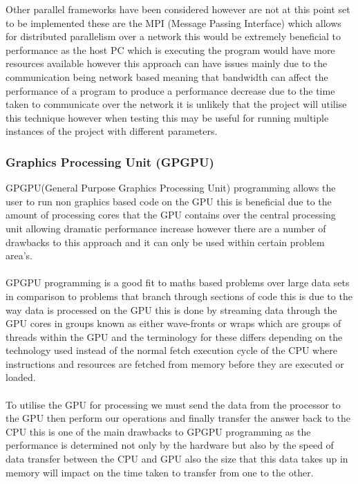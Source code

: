Other parallel frameworks have been considered however are not at this point set to be implemented these are the MPI (Message Passing Interface)\cite{mpi} which allows for distributed parallelism over a network this would be extremely beneficial to performance as the host PC which is executing the program would have more resources available however this approach can have issues mainly due to the communication being network based meaning that bandwidth can affect the performance of a program to produce a performance decrease due to the time taken to communicate over the network it is unlikely that the project will utilise this technique however when testing this may be useful for running multiple instances of the project with different parameters. 

\subsubsection{Graphics Processing Unit (GPGPU)}
GPGPU(General Purpose Graphics Processing Unit) programming allows the user to run non graphics based code on the GPU this is beneficial due to the amount of processing cores that the GPU contains over the central processing unit allowing dramatic performance increase however there are a number of drawbacks to this approach and it can only be used within certain problem area's.\\\\ GPGPU programming is a good fit to maths based problems over large data sets in comparison to problems that branch through sections of code this is due to the way data is processed on the GPU this is done by streaming data through the GPU cores in groups known as either wave-fronts or wraps which are groups of threads within the GPU and the terminology for these differs depending on the technology used instead of the normal fetch execution cycle of the CPU where instructions and resources are fetched from memory before they are executed or loaded.\\\\ To utilise the GPU for processing we must send the data from the processor to the GPU then perform our operations and finally transfer the answer back to the CPU this is one of the main drawbacks to GPGPU programming as the performance is determined not only by the hardware but also by the speed of data transfer between the CPU and GPU also the size that this data takes up in memory will impact on the time taken to transfer from one to the other.\\    

